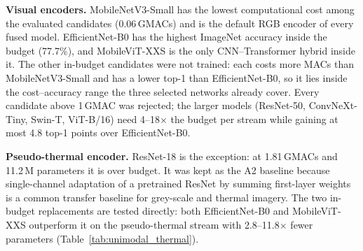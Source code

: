 \documentclass[journal]{IEEEtran}
\begin{document}
\textbf{Visual encoders.} MobileNetV3-Small has the lowest computational cost among the evaluated candidates (0.06\,GMACs) and is the default RGB encoder of every fused model. EfficientNet-B0 has the highest ImageNet accuracy inside the budget (77.7\%), and MobileViT-XXS is the only CNN--Transformer hybrid inside it. The other in-budget candidates were not trained: each costs more MACs than MobileNetV3-Small and has a lower top-1 than EfficientNet-B0, so it lies inside the cost--accuracy range the three selected networks already cover. Every candidate above 1\,GMAC was rejected; the larger models (ResNet-50, ConvNeXt-Tiny, Swin-T, ViT-B/16) need 4--18$\times$ the budget per stream while gaining at most 4.8 top-1 points over EfficientNet-B0.

\textbf{Pseudo-thermal encoder.} ResNet-18 is the exception: at 1.81\,GMACs and 11.2\,M parameters it is over budget. It was kept as the A2 baseline because single-channel adaptation of a pretrained ResNet by summing first-layer weights is a common transfer baseline for grey-scale and thermal imagery. The two in-budget replacements are tested directly: both EfficientNet-B0 and MobileViT-XXS outperform it on the pseudo-thermal stream with 2.8--11.8$\times$ fewer parameters (Table~\ref{tab:unimodal_thermal}).

\begin{table}[!t]
\centering
\caption[Audio backbone candidates]{Audio backbone candidates ($1\times64\times63$ log-mel input). Lower rows are full-network figures from Kong et al.~\cite{kong2020panns}, shown for scale.}
\label{tab:audio_candidates}
\end{table}
\end{document}
